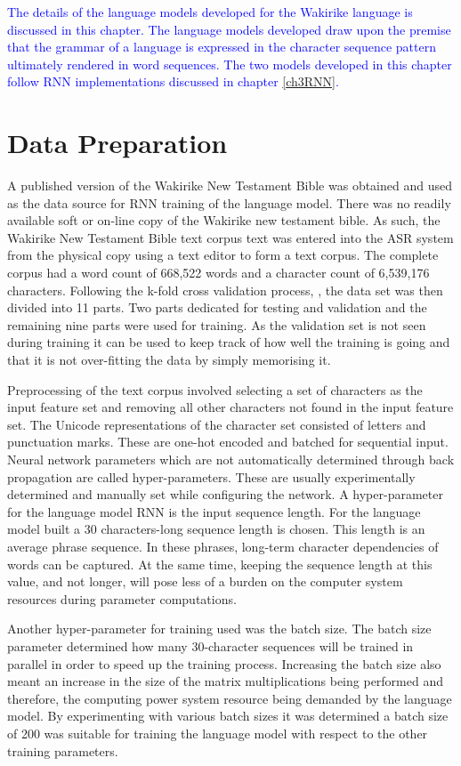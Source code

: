 
\textcolor{blue}{
The details of the language models developed for the Wakirike language is discussed in this chapter.  The language models developed draw  upon the premise that the grammar of a language is expressed in the character sequence pattern ultimately rendered in word sequences.  The two models developed in this chapter follow RNN implementations discussed in chapter \ref{ch3RNN}. }

\section{Data Preparation}
\startblue
A published version of the Wakirike New Testament Bible was obtained and used as the data source for RNN training of the language model.  There was no readily available soft or on-line copy of the Wakirike new testament bible. As such, the Wakirike New Testament Bible text corpus text was entered into the ASR system from the physical copy using a text editor to form a text corpus.  The complete corpus had a word count of 668,522 words and a character count of 6,539,176 characters. Following the k-fold cross validation process, \citep{geron2019hands}, the data set was then divided into 11 parts. Two parts dedicated for testing and validation and the remaining nine parts were used for training. As the validation set is not seen during training it can be used to keep track of how well the training is going and that it is not over-fitting the data by simply memorising it.

Preprocessing of the text corpus involved selecting a set of characters as the input feature set and removing all other characters not found in the input feature set.  The Unicode representations of the character set consisted of letters and punctuation marks.  These are one-hot encoded and batched for sequential input.  Neural network parameters which are not automatically determined through back propagation are called hyper-parameters.  These are usually experimentally determined and manually set while configuring the network.  A hyper-parameter for the language model RNN is the input sequence length.  For the language model built a 30 characters-long sequence length is chosen.  This  length is an average phrase sequence.  In these phrases, long-term character dependencies of words can be captured. At the same time, keeping the sequence length at this value, and not longer, will pose less of a burden on the computer system resources during parameter computations.  

Another hyper-parameter for training used was the batch size.  The batch size parameter determined how many 30-character sequences will be trained in parallel in order to speed up the training process.  Increasing the batch size also meant an increase in the size of the matrix multiplications being performed and therefore, the computing power system resource being demanded by the language model.  By experimenting with various batch sizes it was determined a batch size of 200 was suitable for training the language model with respect to the other training parameters.

